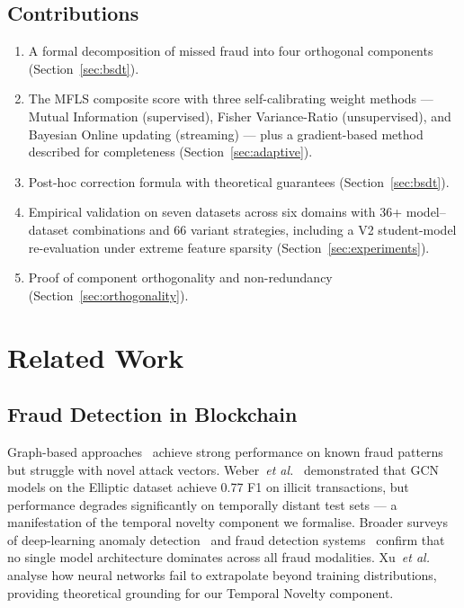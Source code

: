 \documentclass[journal]{IEEEtran}
\newcommand{\etal}{\textit{et al.}}
\begin{document}
\subsection{Contributions}
\label{ssec:contributions}

\begin{enumerate}
  \item A formal decomposition of missed fraud into four orthogonal components (Section~\ref{sec:bsdt}).
  \item The MFLS composite score with three self-calibrating weight methods --- Mutual Information (supervised), Fisher Variance-Ratio (unsupervised), and Bayesian Online updating (streaming) --- plus a gradient-based method described for completeness (Section~\ref{sec:adaptive}).
  \item Post-hoc correction formula with theoretical guarantees (Section~\ref{sec:bsdt}).
  \item Empirical validation on seven datasets across six domains with 36+ model--dataset combinations and 66 variant strategies, including a V2 student-model re-evaluation under extreme feature sparsity (Section~\ref{sec:experiments}).
  \item Proof of component orthogonality and non-redundancy (Section~\ref{sec:orthogonality}).
\end{enumerate}

\section{Related Work}
\label{sec:related}

\subsection{Fraud Detection in Blockchain}

Graph-based approaches~\cite{weber2019,wu2022} achieve strong performance on known fraud patterns but struggle with novel attack vectors. Weber~\etal~\cite{weber2019} demonstrated that GCN models on the Elliptic dataset achieve 0.77 F1 on illicit transactions, but performance degrades significantly on temporally distant test sets --- a manifestation of the temporal novelty component we formalise. Broader surveys of deep-learning anomaly detection~\cite{pang2021} and fraud detection systems~\cite{abdallah2016} confirm that no single model architecture dominates across all fraud modalities. Xu~\etal~\cite{xu2020} analyse how neural networks fail to extrapolate beyond training distributions, providing theoretical grounding for our Temporal Novelty component.
\end{document}
